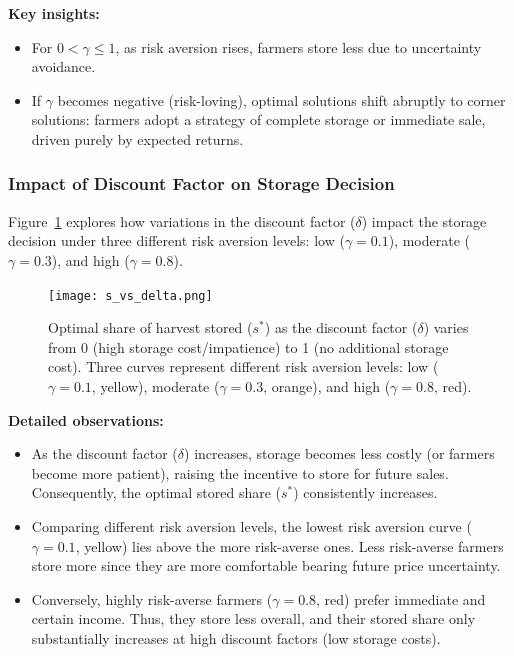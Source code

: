 \documentclass[12pt]{article}
\begin{document}
\textbf{Key insights:}
\begin{itemize}
    \item For $0<\gamma\leq1$, as risk aversion rises, farmers store less due to uncertainty avoidance.
    \item If $\gamma$ becomes negative (risk-loving), optimal solutions shift abruptly to corner solutions: farmers adopt a strategy of complete storage or immediate sale, driven purely by expected returns.
\end{itemize}

\subsubsection{Impact of Discount Factor on Storage Decision}

Figure~\ref{fig:delta} explores how variations in the discount factor ($\delta$) impact the storage decision under three different risk aversion levels: low ($\gamma=0.1$), moderate ($\gamma=0.3$), and high ($\gamma=0.8$).

\begin{figure}[H]
    \centering
    \texttt{[image: s\_vs\_delta.png]}
    \caption{Optimal share of harvest stored ($s^*$) as the discount factor ($\delta$) varies from 0 (high storage cost/impatience) to 1 (no additional storage cost). Three curves represent different risk aversion levels: low ($\gamma=0.1$, yellow), moderate ($\gamma=0.3$, orange), and high ($\gamma=0.8$, red).}
    \label{fig:delta}
\end{figure}

\textbf{Detailed observations:}
\begin{itemize}
    \item As the discount factor ($\delta$) increases, storage becomes less costly (or farmers become more patient), raising the incentive to store for future sales. Consequently, the optimal stored share ($s^*$) consistently increases.
    \item Comparing different risk aversion levels, the lowest risk aversion curve ($\gamma=0.1$, yellow) lies above the more risk-averse ones. Less risk-averse farmers store more since they are more comfortable bearing future price uncertainty.
    \item Conversely, highly risk-averse farmers ($\gamma=0.8$, red) prefer immediate and certain income. Thus, they store less overall, and their stored share only substantially increases at high discount factors (low storage costs).
\end{itemize}
\end{document}
